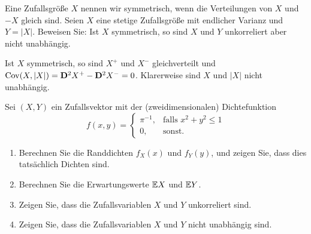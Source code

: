  Eine Zufallsgröße $X$ nennen wir
symmetrisch, wenn die Verteilungen von $X$ und $-X$ gleich sind. Seien $X$ eine
stetige Zufallsgröße mit endlicher Varianz und $Y = |X|$. Beweisen Sie: Ist $X$
symmetrisch, so sind $X$ und $Y$ unkorreliert aber nicht unabhängig.

\solution Ist $X$ symmetrisch, so sind $X^{+}$ und $X^{-}$
gleichverteilt und $\operatorname{Cov}(X, |X|) = \mathbf D^2 X^{+} - \mathbf D^{2} X^{-}
= 0$. Klarerweise sind $X$ und $|X|$ nicht unabhängig. 

 Sei $(X,Y)$
ein Zufallsvektor mit der (zweidimensionalen) Dichtefunktion 
\begin{equation*}
    f(x,y) = \begin{cases}
        \pi^{-1}, & \text{falls } x^{2}+y^{2} \leq 1 \\
        0,& \text{sonst.}
    \end{cases}
\end{equation*}
\begin{enumerate}
    \item Berechnen Sie die Randdichten $f_{X}(x)$ und $f_{Y}(y)$, und zeigen
        Sie, dass dies tatsächlich Dichten sind.
        
    \item Berechnen Sie die Erwartungswerte $\mathbb{E} X$ und $\mathbb{E} Y$.

    \item Zeigen Sie, dass die Zufallsvariablen $X$ und $Y$ unkorreliert sind.
    \item Zeigen Sie, dass die Zufallsvariablen $X$ und $Y$ nicht unabhängig sind. 
\end{enumerate}

